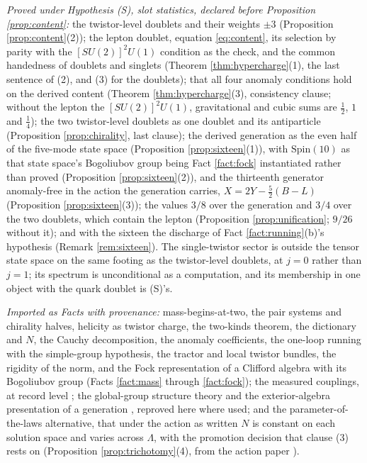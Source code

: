 \documentclass[11pt]{article}
\theoremstyle{definition}
\begin{document}
\emph{Proved under Hypothesis (S), slot statistics, declared before Proposition \ref{prop:content}:} the twistor-level doublets and their weights $\pm 3$ (Proposition \ref{prop:content}(2)); the lepton doublet, equation \eqref{eq:content}, its selection by parity with the $[SU(2)]^{2}U(1)$ condition as the check, and the common handedness of doublets and singlets (Theorem \ref{thm:hypercharge}(1), the last sentence of (2), and (3) for the doublets); that all four anomaly conditions hold on the derived content (Theorem \ref{thm:hypercharge}(3), consistency clause; without the lepton the $[SU(2)]^{2}U(1)$, gravitational and cubic sums are $\tfrac12$, $1$ and $\tfrac14$); the two twistor-level doublets as one doublet and its antiparticle (Proposition \ref{prop:chirality}, last clause); the derived generation as the even half of the five-mode state space (Proposition \ref{prop:sixteen}(1)), with $\mathrm{Spin}(10)$ as that state space's Bogoliubov group being Fact \ref{fact:fock} instantiated rather than proved (Proposition \ref{prop:sixteen}(2)), and the thirteenth generator anomaly-free in the action the generation carries, $X = 2Y - \tfrac52(B - L)$ (Proposition \ref{prop:sixteen}(3)); the values $3/8$ over the generation and $3/4$ over the two doublets, which contain the lepton (Proposition \ref{prop:unification}; $9/26$ without it); and with the sixteen the discharge of Fact \ref{fact:running}(b)'s hypothesis (Remark \ref{rem:sixteen}). The single-twistor sector is outside the tensor state space on the same footing as the twistor-level doublets, at $j = 0$ rather than $j = 1$; its spectrum is unconditional as a computation, and its membership in one object with the quark doublet is (S)'s.

\emph{Imported as Facts with provenance:} mass-begins-at-two, the pair systems and chirality halves, helicity as twistor charge, the two-kinds theorem, the dictionary and $N$, the Cauchy decomposition, the anomaly coefficients, the one-loop running with the simple-group hypothesis, the tractor and local twistor bundles, the rigidity of the norm, and the Fock representation of a Clifford algebra with its Bogoliubov group (Facts \ref{fact:mass} through \ref{fact:fock}); the measured couplings, at record level \cite{PDG2024}; the global-group structure theory and the exterior-algebra presentation of a generation \cite{BaezHuerta2010, Tong2017}, reproved here where used; and the parameter-of-the-laws alternative, that under the action as written $N$ is constant on each solution space and varies across $\Lambda$, with the promotion decision that clause (3) rests on (Proposition \ref{prop:trichotomy}(4), from the action paper \cite[Prop.~5.8, Rem.~5.9]{ButlerT10}).
\end{document}
